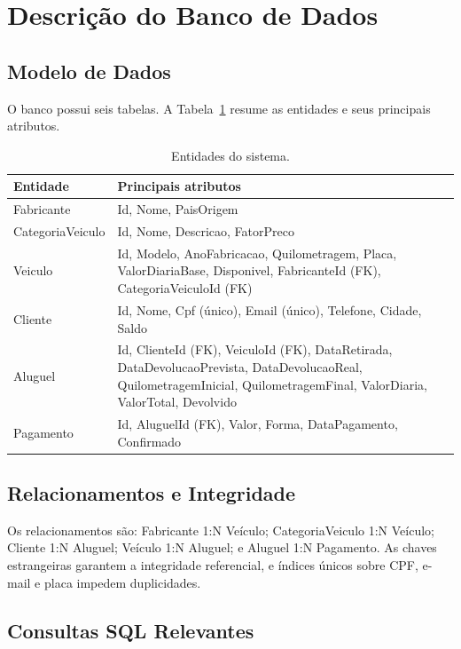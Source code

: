 \documentclass[12pt]{article}
\begin{document}
\section{Descrição do Banco de Dados}

\subsection{Modelo de Dados}

O banco possui seis tabelas. A Tabela~\ref{tab:entidades} resume as entidades e seus principais atributos.

\begin{table}[h]
\centering
\caption{Entidades do sistema.}
\label{tab:entidades}
\begin{tabular}{|l|p{9.5cm}|}
\hline
\textbf{Entidade} & \textbf{Principais atributos} \\
\hline
Fabricante & Id, Nome, PaisOrigem \\
\hline
CategoriaVeiculo & Id, Nome, Descricao, FatorPreco \\
\hline
Veiculo & Id, Modelo, AnoFabricacao, Quilometragem, Placa, ValorDiariaBase, Disponivel, FabricanteId (FK), CategoriaVeiculoId (FK) \\
\hline
Cliente & Id, Nome, Cpf (único), Email (único), Telefone, Cidade, Saldo \\
\hline
Aluguel & Id, ClienteId (FK), VeiculoId (FK), DataRetirada, DataDevolucaoPrevista, DataDevolucaoReal, QuilometragemInicial, QuilometragemFinal, ValorDiaria, ValorTotal, Devolvido \\
\hline
Pagamento & Id, AluguelId (FK), Valor, Forma, DataPagamento, Confirmado \\
\hline
\end{tabular}
\end{table}

\subsection{Relacionamentos e Integridade}

Os relacionamentos são: Fabricante 1:N Veículo; CategoriaVeiculo 1:N Veículo; Cliente 1:N Aluguel; Veículo 1:N Aluguel; e Aluguel 1:N Pagamento. As chaves estrangeiras garantem a integridade referencial, e índices únicos sobre CPF, e-mail e placa impedem duplicidades.

\subsection{Consultas SQL Relevantes}
\end{document}
